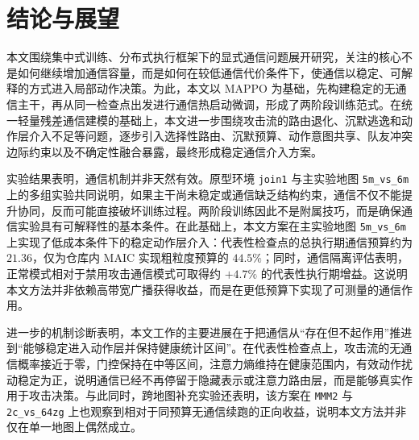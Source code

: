 %
%
%
%
%
%
%
%
\chapter{结论与展望}

本文围绕集中式训练、分布式执行框架下的显式通信问题展开研究，关注的核心不是如何继续增加通信容量，而是如何在较低通信代价条件下，使通信以稳定、可解释的方式进入局部动作决策。为此，本文以 MAPPO 为基础，先构建稳定的无通信主干，再从同一检查点出发进行通信热启动微调，形成了两阶段训练范式。在统一轻量残差通信建模的基础上，本文进一步围绕攻击流的路由退化、沉默逃逸和动作层介入不足等问题，逐步引入选择性路由、沉默预算、动作意图共享、队友冲突边际约束以及不确定性融合暴露，最终形成稳定通信介入方案。

实验结果表明，通信机制并非天然有效。原型环境 \texttt{join1} 与主实验地图 \texttt{5m\_vs\_6m} 上的多组实验共同说明，如果主干尚未稳定或通信缺乏结构约束，通信不仅不能提升协同，反而可能直接破坏训练过程。两阶段训练因此不是附属技巧，而是确保通信实验具有可解释性的基本条件。在此基础上，本文方案在主实验地图 \texttt{5m\_vs\_6m} 上实现了低成本条件下的稳定动作层介入：代表性检查点的总执行期通信预算约为 $21.36$，仅为仓库内 MAIC 实现粗粒度预算的 $44.5\%$；同时，通信隔离评估表明，正常模式相对于禁用攻击通信模式可取得约 $+4.7\%$ 的代表性执行期增益。这说明本文方法并非依赖高带宽广播获得收益，而是在更低预算下实现了可测量的通信作用。

进一步的机制诊断表明，本文工作的主要进展在于把通信从“存在但不起作用”推进到“能够稳定进入动作层并保持健康统计区间”。在代表性检查点上，攻击流的无通信概率接近于零，门控保持在中等区间，注意力熵维持在健康范围内，有效动作扰动稳定为正，说明通信已经不再停留于隐藏表示或注意力路由层，而是能够真实作用于攻击决策。与此同时，跨地图补充实验还表明，该方案在 \texttt{MMM2} 与 \texttt{2c\_vs\_64zg} 上也观察到相对于同预算无通信续跑的正向收益，说明本文方法并非仅在单一地图上偶然成立。

